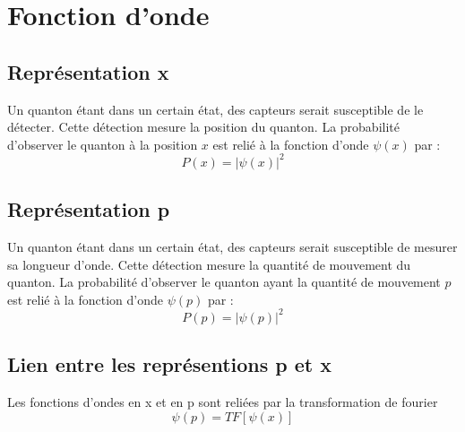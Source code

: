 
\section{Fonction d'onde}


\subsection{Représentation x}
Un quanton étant dans un certain état, des capteurs serait susceptible de le détecter. Cette détection mesure la position du quanton. La probabilité d'observer le quanton à la position $x$ est relié à la fonction d'onde $\psi(x)$ par : 
\[
P(x)=|\psi(x)|^2
\]


\subsection{Représentation p}
Un quanton étant dans un certain état, des capteurs serait susceptible de mesurer sa longueur d'onde. Cette détection mesure la quantité de mouvement du quanton. La probabilité d'observer le quanton ayant la quantité de mouvement $p$ est relié à la fonction d'onde $\psi(p)$ par : 
\[
P(p)=|\psi(p)|^2
\]


\subsection{Lien entre les représentions p et x}

Les fonctions d'ondes en x et en p sont reliées par la transformation de fourier
\[
\psi(p) = TF[\psi(x)]
\]
